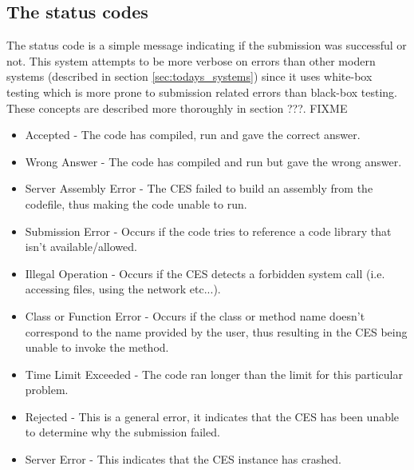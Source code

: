 \subsection{The status codes} \label{subsec:status_codes}
The status code is a simple message indicating if the submission was successful or not. This system attempts to be more verbose on errors than other modern systems (described in section \ref{sec:todays_systems}) since it uses white-box testing which is more prone to submission related errors than black-box testing. These concepts are described more thoroughly in section ???. FIXME
\begin{itemize}
	\item Accepted - The code has compiled, run and gave the correct answer.
	\item Wrong Answer - The code has compiled and run but gave the wrong answer.
	\item Server Assembly Error - The CES failed to build an assembly from the codefile, thus making the code unable to run.
	\item Submission Error - Occurs if the code tries to reference a code library that isn't available/allowed. 
	\item Illegal Operation - Occurs if the CES detects a forbidden system call (i.e. accessing files, using the network etc...).
	\item Class or Function Error - Occurs if the class or method name doesn't correspond to the name provided by the user, thus resulting in the CES being unable to invoke the method.
	\item Time Limit Exceeded - The code ran longer than the limit for this particular problem.
	\item Rejected - This is a general error, it indicates that the CES has been unable to determine why the submission failed. 
	\item Server Error - This indicates that the CES instance has crashed.
\end{itemize}

